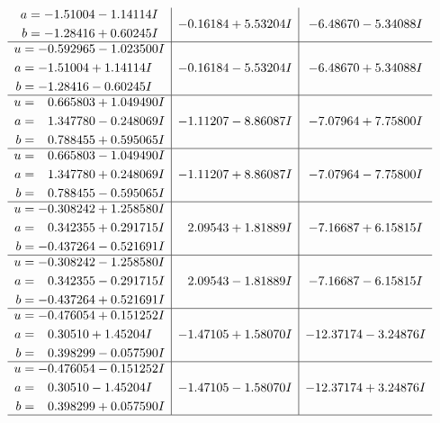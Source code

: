 \documentclass[1p]{elsarticle_modified}
\theoremstyle{definition}
\begin{document}
$$\begin{array}{c|c|c}
\begin{aligned}
a &= -1.51004 - 1.14114 I \\
b &= -1.28416 + 0.60245 I\end{aligned}
 & -0.16184 + 5.53204 I & -6.48670 - 5.34088 I \\ \hline\begin{aligned}
u &= -0.592965 - 1.023500 I \\
a &= -1.51004 + 1.14114 I \\
b &= -1.28416 - 0.60245 I\end{aligned}
 & -0.16184 - 5.53204 I & -6.48670 + 5.34088 I \\ \hline\begin{aligned}
u &= \phantom{-}0.665803 + 1.049490 I \\
a &= \phantom{-}1.347780 - 0.248069 I \\
b &= \phantom{-}0.788455 + 0.595065 I\end{aligned}
 & -1.11207 - 8.86087 I & -7.07964 + 7.75800 I \\ \hline\begin{aligned}
u &= \phantom{-}0.665803 - 1.049490 I \\
a &= \phantom{-}1.347780 + 0.248069 I \\
b &= \phantom{-}0.788455 - 0.595065 I\end{aligned}
 & -1.11207 + 8.86087 I & -7.07964 - 7.75800 I \\ \hline\begin{aligned}
u &= -0.308242 + 1.258580 I \\
a &= \phantom{-}0.342355 + 0.291715 I \\
b &= -0.437264 - 0.521691 I\end{aligned}
 & \phantom{-}2.09543 + 1.81889 I & -7.16687 + 6.15815 I \\ \hline\begin{aligned}
u &= -0.308242 - 1.258580 I \\
a &= \phantom{-}0.342355 - 0.291715 I \\
b &= -0.437264 + 0.521691 I\end{aligned}
 & \phantom{-}2.09543 - 1.81889 I & -7.16687 - 6.15815 I \\ \hline\begin{aligned}
u &= -0.476054 + 0.151252 I \\
a &= \phantom{-}0.30510 + 1.45204 I \\
b &= \phantom{-}0.398299 - 0.057590 I\end{aligned}
 & -1.47105 + 1.58070 I & -12.37174 - 3.24876 I \\ \hline\begin{aligned}
u &= -0.476054 - 0.151252 I \\
a &= \phantom{-}0.30510 - 1.45204 I \\
b &= \phantom{-}0.398299 + 0.057590 I\end{aligned}
 & -1.47105 - 1.58070 I & -12.37174 + 3.24876 I\\
 \hline 
 \end{array}$$\newpage
\end{document}
